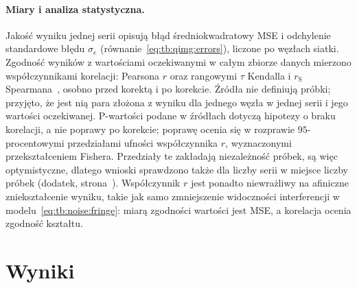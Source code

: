 \paragraph{Miary i analiza statystyczna.}
Jakość wyniku jednej serii opisują błąd średniokwadratowy MSE i odchylenie standardowe błędu $\sigma_e$ (równanie~\eqref{eq:tb:qimg:errors}), liczone po węzłach siatki.
Zgodność wyników z wartościami oczekiwanymi w całym zbiorze danych mierzono współczynnikami korelacji: Pearsona $r$ oraz rangowymi $\tau$ Kendalla i $r_{\mathrm{S}}$ Spearmana~\cite{bib:statistics_wilc}, osobno przed korektą i po korekcie.
Źródła nie definiują próbki; przyjęto, że jest nią para złożona z wyniku dla jednego węzła w jednej serii i jego wartości oczekiwanej.
P-wartości podane w źródłach dotyczą hipotezy o braku korelacji, a nie poprawy po korekcie; poprawę ocenia się w rozprawie $95$-procentowymi przedziałami ufności współczynnika $r$, wyznaczonymi przekształceniem Fishera.
Przedziały te zakładają niezależność próbek, są więc optymistyczne, dlatego wnioski sprawdzono także dla liczby serii w miejsce liczby próbek (dodatek, strona~\pageref{tab:pdu:app:pvalues}).
Współczynnik $r$ jest ponadto niewrażliwy na afiniczne zniekształcenie wyniku, takie jak samo zmniejszenie widoczności interferencji w modelu~\eqref{eq:tb:noise:fringe}: miarą zgodności wartości jest MSE, a korelacja ocenia zgodność kształtu.

\section{Wyniki}\label{sec:pdu:results}

